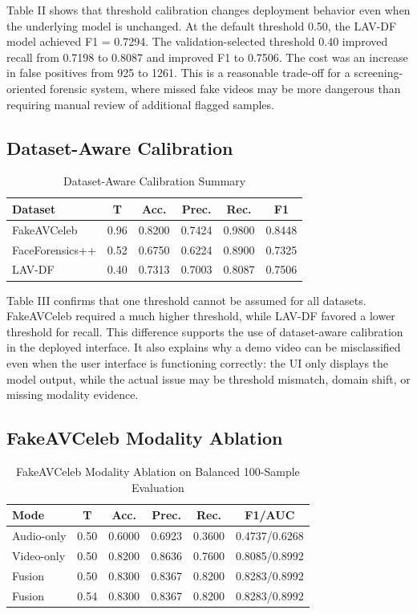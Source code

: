 \documentclass[conference]{IEEEtran}
\begin{document}
Table II shows that threshold calibration changes deployment behavior even when the underlying model is unchanged. At the default threshold 0.50, the LAV-DF model achieved F1 = 0.7294. The validation-selected threshold 0.40 improved recall from 0.7198 to 0.8087 and improved F1 to 0.7506. The cost was an increase in false positives from 925 to 1261. This is a reasonable trade-off for a screening-oriented forensic system, where missed fake videos may be more dangerous than requiring manual review of additional flagged samples.

\subsection{Dataset-Aware Calibration}
\begin{table}[htbp]
\caption{Dataset-Aware Calibration Summary}
\centering
\begin{tabular}{lccccc}
\toprule
Dataset & T & Acc. & Prec. & Rec. & F1 \\
\midrule
FakeAVCeleb & 0.96 & 0.8200 & 0.7424 & 0.9800 & 0.8448 \\
FaceForensics++ & 0.52 & 0.6750 & 0.6224 & 0.8900 & 0.7325 \\
LAV-DF & 0.40 & 0.7313 & 0.7003 & 0.8087 & 0.7506 \\
\bottomrule
\end{tabular}
\end{table}

Table III confirms that one threshold cannot be assumed for all datasets. FakeAVCeleb required a much higher threshold, while LAV-DF favored a lower threshold for recall. This difference supports the use of dataset-aware calibration in the deployed interface. It also explains why a demo video can be misclassified even when the user interface is functioning correctly: the UI only displays the model output, while the actual issue may be threshold mismatch, domain shift, or missing modality evidence.

\subsection{FakeAVCeleb Modality Ablation}
\begin{table}[htbp]
\caption{FakeAVCeleb Modality Ablation on Balanced 100-Sample Evaluation}
\centering
\begin{tabular}{lccccc}
\toprule
Mode & T & Acc. & Prec. & Rec. & F1/AUC \\
\midrule
Audio-only & 0.50 & 0.6000 & 0.6923 & 0.3600 & 0.4737/0.6268 \\
Video-only & 0.50 & 0.8200 & 0.8636 & 0.7600 & 0.8085/0.8992 \\
Fusion & 0.50 & 0.8300 & 0.8367 & 0.8200 & 0.8283/0.8992 \\
Fusion & 0.54 & 0.8300 & 0.8367 & 0.8200 & 0.8283/0.8992 \\
\bottomrule
\end{tabular}
\end{table}
\end{document}
